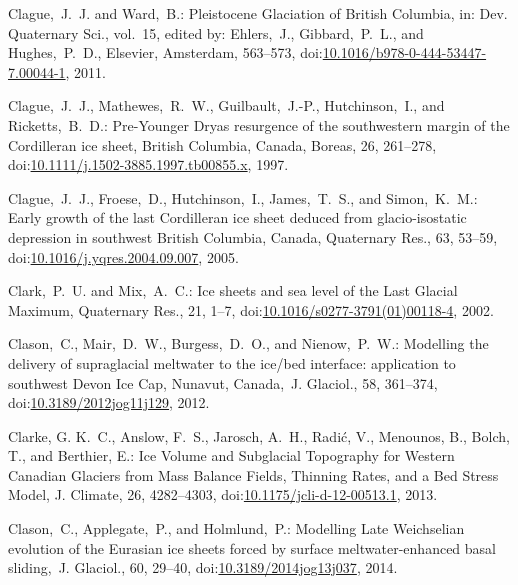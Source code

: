 \documentclass[tc, manuscript]{copernicus}
\begin{document}
\begin{thebibliography}{114}
Clague,~J.~J. and Ward,~B.: Pleistocene Glaciation of British
Columbia, in:   Dev. Quaternary Sci., vol.~15, edited by: Ehlers,~J., Gibbard,~P.~L., and Hughes,~P.~D., Elsevier, Amsterdam, 563--573,
doi:\href{http://dx.doi.org/10.1016/b978-0-444-53447-7.00044-1}{10.1016/b978-0-444-53447-7.00044-1}, 2011.


Clague,~J.~J., Mathewes,~R.~W., Guilbault,~J.-P., Hutchinson,~I., and Ricketts,~B.~D.: Pre-Younger Dryas resurgence of the southwestern margin of the Cordilleran ice sheet, British Columbia, Canada, Boreas, 26, 261--278,
doi:\href{http://dx.doi.org/10.1111/j.1502-3885.1997.tb00855.x}{10.1111/j.1502-3885.1997.tb00855.x}, 1997.


Clague,~J.~J., Froese,~D., Hutchinson,~I., James,~T.~S., and Simon,~K.~M.: Early growth of the last Cordilleran ice sheet deduced from glacio-isostatic depression in southwest British Columbia, Canada, Quaternary Res., 63, 53--59,
doi:\href{http://dx.doi.org/10.1016/j.yqres.2004.09.007}{10.1016/j.yqres.2004.09.007}, 2005.


Clark,~P.~U. and Mix,~A.~C.: Ice sheets and sea level of the Last Glacial Maximum, Quaternary Res., 21, 1--7,
doi:\href{http://dx.doi.org/10.1016/s0277-3791(01)00118-4}{10.1016/s0277-3791(01)00118-4}, 2002.


Clason,~C., Mair,~D.~W., Burgess,~D.~O., and Nienow,~P.~W.: Modelling the delivery of supraglacial meltwater to the ice/bed interface: application to southwest Devon Ice Cap, Nunavut, Canada,~J. Glaciol., 58, 361--374,
doi:\href{http://dx.doi.org/10.3189/2012jog11j129}{10.3189/2012jog11j129}, 2012.


Clarke, G. K.~C., Anslow, F.~S., Jarosch, A.~H., Radi{\'{c}}, V., Menounos, B., Bolch, T., and Berthier, E.: Ice Volume and Subglacial Topography for Western Canadian Glaciers from Mass Balance Fields, Thinning Rates, and a Bed Stress Model, J. Climate, 26, 4282--4303,
doi:\href{http://dx.doi.org/10.1175/jcli-d-12-00513.1}{10.1175/jcli-d-12-00513.1}, 2013.


Clason,~C., Applegate,~P., and Holmlund,~P.: Modelling Late Weichselian evolution of the Eurasian ice sheets forced by surface meltwater-enhanced basal sliding,~J. Glaciol., 60, 29--40,
doi:\href{http://dx.doi.org/10.3189/2014jog13j037}{10.3189/2014jog13j037}, 2014.



\end{thebibliography}
\end{document}
